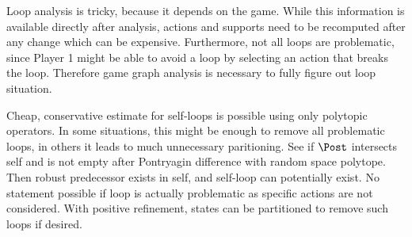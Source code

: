     Loop analysis is tricky, because it depends on the game.
    While this information is available directly after analysis, actions and supports need to be recomputed after any change which can be expensive.
    Furthermore, not all loops are problematic, since Player 1 might be able to avoid a loop by selecting an action that breaks the loop.
    Therefore game graph analysis is necessary to fully figure out loop situation.

    Cheap, conservative estimate for self-loops is possible using only polytopic operators.
    In some situations, this might be enough to remove all problematic loops, in others it leads to much unnecessary paritioning.
    See if $\Post$ intersects self and is not empty after Pontryagin difference with random space polytope.
    Then robust predecessor exists in self, and self-loop can potentially exist.
    No statement possible if loop is actually problematic as specific actions are not considered.
    With positive refinement, states can be partitioned to remove such loops if desired.

\stopsubsection

